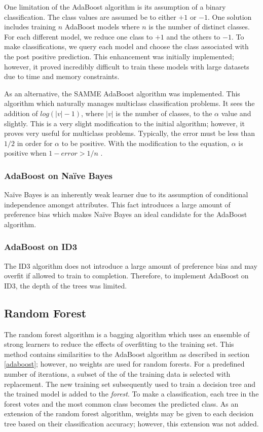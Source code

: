\documentclass[11pt]{article}
\newcommand{\ii}{\textit}
\begin{document}
One limitation of the AdaBoost algorithm is its assumption of a binary classification. The class values are assumed be to either $+1$ or $-1$. One solution includes training $n$ AdaBoost models where $n$ is the number of distinct classes. For each different model, we reduce one class to $+1$ and the others to $-1$. To make classifications, we query each model and choose the class associated with the post positive prediction. This enhancement was initially implemented; however, it proved incredibly difficult to train these models with large datasets due to time and memory constraints.

As an alternative, the SAMME AdaBoost algorithm \cite{samme} was implemented. This algorithm which naturally manages multiclass classification problems. It sees the addition of $log(|v|-1)$, where $|v|$ is the number of classes, to the $\alpha$ value and slightly. This is a very slight modification to the initial algorithm; however, it proves very useful for multiclass problems. Typically, the error must be less than $1/2$ in order for $\alpha$ to be positive. With the modification to the equation, $\alpha$ is positive when $1-error > 1/n$ \cite{samme}.

\subsubsection{AdaBoost on Naïve Bayes}
Naïve Bayes is an inherently weak learner due to its assumption of conditional independence amongst attributes. This fact introduces a large amount of preference bias which makes Naïve Bayes an ideal candidate for the AdaBoost algorithm.

\subsubsection{AdaBoost on ID3}
The ID3 algorithm does not introduce a large amount of preference bias and may overfit if allowed to train to completion. Therefore, to implement AdaBoost on ID3, the depth of the trees was limited.

\subsection{Random Forest}
The random forest algorithm is a bagging algorithm which uses an ensemble of strong learners to reduce the effects of overfitting to the training set. This method contains similarities to the AdaBoost algorithm as described in section \ref{adaboost}; however, no weights are used for random forests. For a predefined number of iterations, a subset of the of the training data is selected with replacement. The new training set subsequently used to train a decision tree and the trained model is added to the \ii{forest}. To make a classification, each tree in the forest votes and the most common class becomes the predicted class. As an extension of the random forest algorithm, weights may be given to each decision tree based on their classification accuracy; however, this extension was not added.
\end{document}
